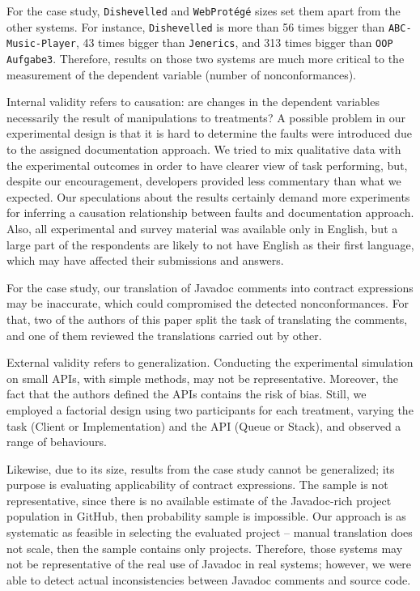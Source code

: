 
For the case study, \texttt{Dishevelled} and
\texttt{WebProt\'{e}g\'{e}} sizes set them apart from the other systems.
For instance, \texttt{Dishevelled} is more than 56 times bigger than \texttt{ABC-Music-Player}, 43
times bigger than \texttt{Jenerics}, and 313 times bigger than \texttt{OOP Aufgabe3}.
Therefore, results on those two systems are much more critical to the measurement of the dependent variable (number of nonconformances).


Internal validity refers to causation: are changes in the dependent variables necessarily the result of manipulations to treatments? A possible problem in our experimental design is that it is hard to determine the faults were introduced due to the assigned documentation approach. We tried to mix qualitative data with the experimental outcomes in order to have clearer view of task performing, but, despite our encouragement, developers provided less commentary than what we expected. Our speculations about the results certainly demand more experiments for inferring a causation relationship between faults and documentation approach.
Also, all experimental and survey material was available only in English, but a large part of the respondents are likely to not have English as their first language, which may have affected their
submissions and answers.

For the case study, our translation of Javadoc comments into contract expressions may be inaccurate, which could compromised the detected nonconformances. For that, two of the authors of this paper split the task of translating the comments, and one of them reviewed the translations carried out by other. 



External validity refers to generalization. 
Conducting the experimental simulation on small APIs, with simple methods, may not be representative. Moreover, the fact that the authors defined the APIs contains the risk of bias. Still, we employed a factorial design using two participants for each treatment, varying the task (Client or Implementation) and the API (Queue or Stack), and observed a range of behaviours. 

Likewise, due to its size, results from the case study cannot be generalized; its purpose is evaluating applicability of contract expressions.
The sample is not representative, since there is no available estimate of the Javadoc-rich project
population in GitHub, then probability sample is impossible. 
Our approach is as systematic as feasible in selecting the evaluated project -- manual translation
does not scale, then the sample contains only \totalSystems{} projects.
Therefore, those systems may not be representative of the real use of Javadoc in real systems; however, we were able to detect actual inconsistencies between Javadoc comments and source code.



